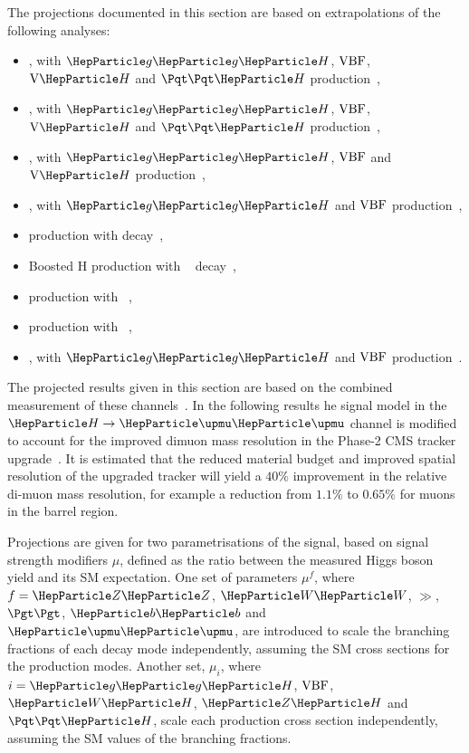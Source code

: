 
The projections documented in this section are based on extrapolations of the following analyses:

\begin{itemize}
	\item \hgg, with $\ggh$, $\mathrm{VBF}$, $\vh$ and $\tth$ production~\cite{Sirunyan:2018ouh},
	\item \hzzllll, with $\ggh$, $\mathrm{VBF}$, $\vh$ and $\tth$ production~\cite{HIG16041},
	\item \hwwlnln, with $\ggh$, $\mathrm{VBF}$ and $\vh$ production~\cite{HIG-16-042},
	\item \htt, with $\ggh$ and $\mathrm{VBF}$ production~\cite{HIG16043},
	\item \vh production with \hbb decay~\cite{HIG16044},
	\item Boosted H production with \hbb~ decay~\cite{HIG17010},
	\item \tth production with \hlep~\cite{Sirunyan:2018shy},
	\item \tth production with \hbb~\cite{bib:hig-17-026,Sirunyan:2018ygk},
	\item \hmm, with $\ggh$ and $\mathrm{VBF}$ production~\cite{HIG-17-019}.
\end{itemize}

The projected results given in this section are based on the combined measurement of these channels~\cite{Sirunyan:2018koj}. In the following results he signal model in the $\hmm$ channel is modified to account for the improved dimuon mass resolution in the Phase-2 CMS tracker upgrade~\cite{Klein:2017nke}. It is estimated that the reduced material budget and improved spatial resolution of the upgraded tracker will yield a $40\%$ improvement in the relative di-muon mass resolution, for example a reduction from $1.1\%$ to $0.65\%$ for muons in the barrel region.


Projections are given for two parametrisations of the signal, based on signal strength modifiers $\mu$, defined as the ratio between the measured Higgs boson yield and its SM expectation. One set of parameters $\mu^{f}$, where $f = \zz$, $\ww$, $\gg$, $\tautau$, $\bb$ and $\mumu$, are introduced to scale the branching fractions of each decay mode independently, assuming the SM cross sections for the production modes. Another set, $\mu_{i}$, where $i=\ggh$, $\mathrm{VBF}$, $\wh$, $\zh$ and $\tth$, scale each production cross section independently, assuming the SM values of the branching fractions.


